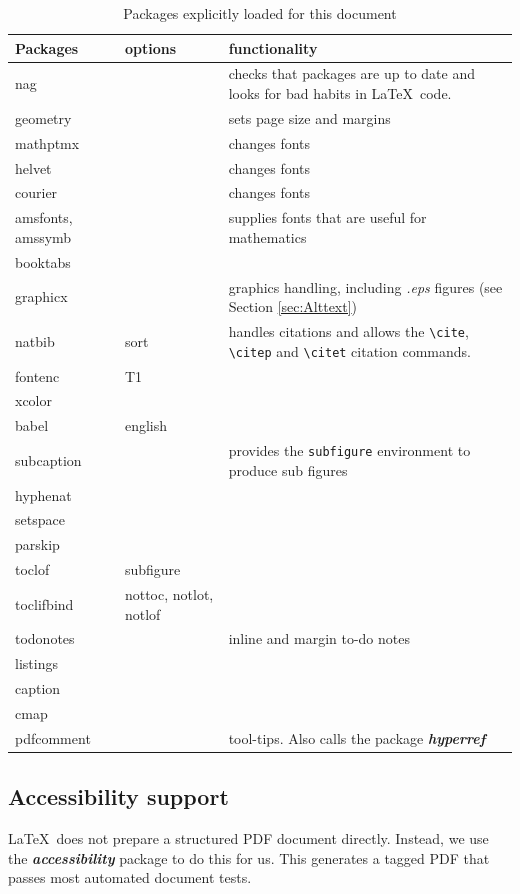 \documentclass[10pt,twocolumn]{article}
\newcommand{\packagename}[1]{\textbf{\emph{#1}}}
\begin{document}
\begin{table}
\centering
\caption[Packages explicitly loaded for this document]{Packages explicitly loaded for this document}
\label{Tab:Packages}
\begin{tabular*}{\textwidth}{lll}
\toprule
Packages & options & functionality\\
\midrule
nag & & checks that packages are up to date and looks for bad habits in \LaTeX\ code.\\
geometry & & sets page size and margins \\
mathptmx& & changes fonts\\
helvet& & changes fonts\\
courier& & changes fonts\\
amsfonts, amssymb & & supplies fonts that are useful for mathematics\\
booktabs & & \\
graphicx & &graphics handling, including \emph{.eps} figures (see Section \ref{sec:Alttext})\\
natbib & sort &handles citations and allows the \verb+\cite+, \verb+\citep+ and \verb+\citet+ citation commands.\\
fontenc & T1 &\\
xcolor & & \\
babel & english & \\
subcaption & & provides the \texttt{subfigure} environment to produce sub figures \\
hyphenat & &\\
setspace & &\\
parskip & & \\
toclof & subfigure &\\
toclifbind & nottoc, notlot, notlof &\\
todonotes & & inline and margin to-do notes \\
listings & &\\
caption & &\\
cmap & & \\
pdfcomment & & tool-tips. Also calls the package \packagename{hyperref} \\
\bottomrule
\end{tabular*}
\end{table}

\subsection{Accessibility support}
\LaTeX\ does not prepare a structured PDF document directly. Instead, we use the \packagename{accessibility} package to do this for us. This generates a tagged PDF that passes most automated document tests.
\end{document}
